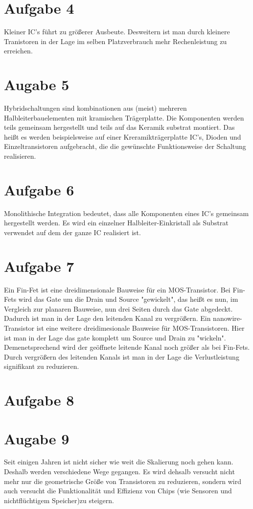 \documentclass[a4paper]{scrartcl}
\begin{document}
\section*{Aufgabe 4}
Kleiner IC's führt zu größerer Ausbeute. Desweitern ist man durch kleinere Tranistoren in der Lage im selben Platzverbrauch mehr Rechenleistung zu erreichen.


\section*{Augabe 5}
Hybridschaltungen sind kombinationen aus (meist) mehreren Halbleiterbauelementen mit kramischen Trägerplatte. Die Komponenten werden teils gemeinsam hergestellt und teils auf das Keramik substrat montiert. Das heißt es werden beispielsweise auf einer Kreramikträgerplatte IC's, Dioden und Einzeltransistoren aufgebracht, die die gewünschte Funktionsweise der Schaltung realisieren.


\section*{Aufgabe 6}
Monolithische Integration bedeutet, dass alle Komponenten eines IC's gemeinsam hergestellt werden. Es wird ein einzelner Halbleiter-Einkristall als Substrat verwendet auf dem der ganze IC realisiert ist.


\section*{Aufgabe 7}
Ein Fin-Fet ist eine dreidimensionale Bauweise für ein MOS-Transistor. Bei Fin-Fets wird das Gate um die Drain und Source "gewickelt", das heißt es nun, im Vergleich zur planaren Bauweise, nun drei Seiten durch das Gate abgedeckt. Dadurch ist man in der Lage den leitenden Kanal zu vergrößern.
Ein nanowire-Transistor ist eine weitere dreidimesionale Bauweise für MOS-Transistoren. Hier ist man in der Lage das gate komplett um Source und Drain zu "wickeln". Demenetsprechend wird der geöffnete leitende Kanal noch größer als bei Fin-Fets. Durch vergrößern des leitenden Kanals ist man in der Lage die Verlustleistung signifikant zu reduzieren.


\section*{Aufgabe 8}



\section*{Augabe 9}
Seit einigen Jahren ist nicht sicher wie weit die Skalierung noch gehen kann. Deshalb werden verschiedene Wege gegangen. Es wird dehsalb versucht nicht mehr nur die geometrische Größe von Transistoren zu reduzieren, sondern wird auch versucht die Funktionalität und Effizienz von Chips (wie Sensoren und nichtflüchtigem Speicher)zu steigern.
\end{document}
